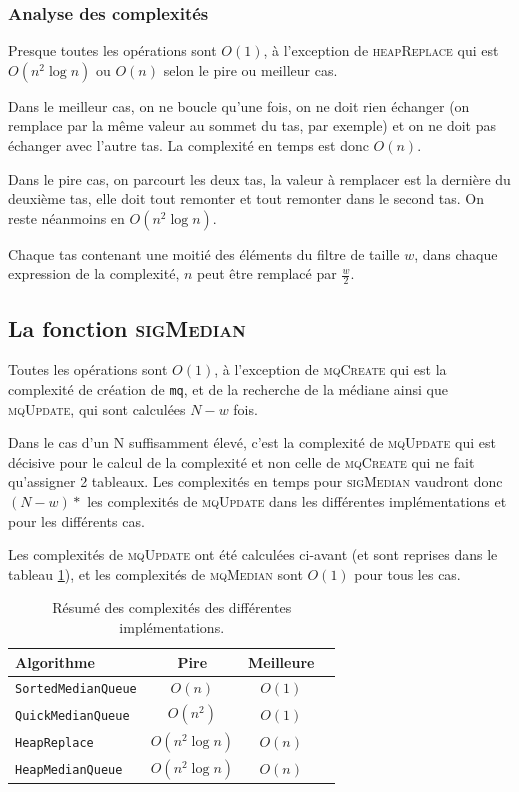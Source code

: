\documentclass[a4paper, 12pt]{article}
\begin{document}
	\subsubsection{Analyse des complexités}
	Presque toutes les opérations sont \(O\left(1\right)\), à l'exception de \textsc{heapReplace} qui est \(O\left(n^2\log n\right)\) ou \(O\left(n\right)\) selon le pire ou meilleur cas.\par
	Dans le meilleur cas, on ne boucle qu'une fois, on ne doit rien échanger (on remplace par la même valeur au sommet du tas, par exemple) et on ne doit pas échanger avec l'autre tas. La complexité en temps est donc \(O\left(n\right)\).\par
	Dans le pire cas, on parcourt les deux tas, la valeur à remplacer est la dernière du deuxième tas, elle doit tout remonter et tout remonter dans le second tas. On reste néanmoins en \(O\left(n^2\log n\right)\).\par
	Chaque tas contenant une moitié des éléments du filtre de taille \(w\), dans chaque expression de la complexité, \(n\) peut être remplacé par \(\frac{w}{2}\).
	\subsection{La fonction \textsc{sigMedian}}
	Toutes les opérations sont \(O\left(1\right)\), à l'exception de \textsc{mqCreate} qui est la complexité de création de \texttt{mq}, et de la recherche de la médiane ainsi que \textsc{mqUpdate}, qui sont calculées \(N-w\) fois.\par
	Dans le cas d'un N suffisamment élevé, c'est la complexité de \textsc{mqUpdate} qui est décisive pour le calcul de la complexité et non celle de \textsc{mqCreate} qui ne fait qu'assigner 2 tableaux. Les complexités en temps pour \textsc{sigMedian} vaudront donc $(N-w) *$ les complexités de \textsc{mqUpdate} dans les différentes implémentations et pour les différents cas.\par
	Les complexités de \textsc{mqUpdate} ont été calculées ci-avant (et sont reprises dans le tableau \ref{tab:complexity}), et les complexités de \textsc{mqMedian} sont \(O\left(1\right)\) pour tous les cas.\par
	\begin{table}[!h]
		\centering
		\begin{tabular}{|l|c|c|c|}
		    \hline
			Algorithme & Pire & Meilleure\\
			\hline
			\hline
			\texttt{SortedMedianQueue} & \(O\left(n\right)\) & \(O\left(1\right)\)\\
			\hline
			\texttt{QuickMedianQueue} & \(O\left(n^2\right)\) & \(O\left(1\right)\)\\
			\hline
			\texttt{HeapReplace} & \(O\left(n^2\log n\right)\) & \(O\left(n\right)\)\\
			\hline
			\texttt{HeapMedianQueue} & \(O\left(n^2\log n\right)\) & \(O\left(n\right)\)\\
			\hline
		\end{tabular}
		\caption{Résumé des complexités des différentes implémentations.}
		\label{tab:complexity}
	\end{table}
\end{document}
